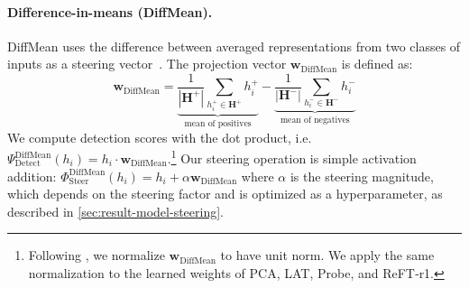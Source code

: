 \documentclass{article}
\theoremstyle{plain}
\theoremstyle{definition}
\theoremstyle{remark}
\renewcommand{\cite}{\citep}
\newcommand{\methodtag}[2]{%
  \tikz[baseline=(char.base)]{%
    \node[
      fill=#1,
      rounded corners=2pt,
      text=white,
      font=\bfseries,
      minimum width=1em,
      minimum height=1em,
      align=center,
      inner sep=0pt
    ](char){#2};%
  }%
}
\newcommand{\concepttag}{\protect\methodtag{conceptcolor}{C}}
\newcommand{\steeringtag}{\protect\methodtag{steeringcolor}{S}}
\begin{document}
\paragraph{\concepttag{}\steeringtag{} Difference-in-means (DiffMean).} DiffMean uses the difference between averaged representations from two classes of inputs as a steering vector~\cite{marks2024geometrytruthemergentlinear}. 
The projection vector \(\mathbf{w}_{\text{DiffMean}}\) is defined as:
\begin{equation}
\mathbf{w}_{\text{DiffMean}} = \underbrace{\frac{1}{|\mathbf{H}^+|}\sum_{h^+_i \in \mathbf{H}^+}{h^+_i}}_{\text{mean of positives}} - \underbrace{\frac{1}{|\mathbf{H}^-|}\sum_{h^-_i \in \mathbf{H}^-}{h^-_i}}_{\text{mean of negatives}}
\end{equation}
We compute detection scores with the dot product, i.e.~$\Psi_{\text{Detect}}^{\text{DiffMean}}(h_i) = h_i\cdot\mathbf{w}_{\text{DiffMean}}$.\footnote{Following \citet{gao2024scalingevaluatingsparseautoencoders}, we normalize $\mathbf{w}_{\text{DiffMean}}$ to have unit norm. We apply the same normalization to the learned weights of PCA, LAT, Probe, and ReFT‑r1.} Our steering operation is simple activation addition: $\Phi_{\text{Steer}}^{\text{DiffMean}}(h_i) = h_i + \alpha \mathbf{w}_{\text{DiffMean}}$ where $\alpha$ is the steering magnitude, which depends on the steering factor and is optimized as a hyperparameter, as described in \cref{sec:result-model-steering}.

\end{document}
